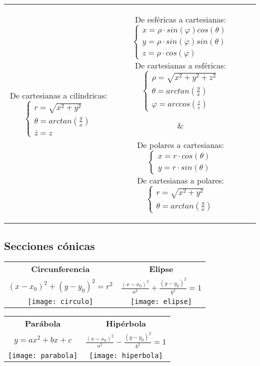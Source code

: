 \documentclass[a4paper, twoside]{article}
\numberwithin{equation}{section}
\numberwithin{figure}{section}
\numberwithin{table}{section}
\begin{document}
\begin{table}[H]
\begin{tabular}{c|c|c}
{\begin{center}
				De cartesianas a cilíndricas:
				$\begin{cases}
				r=\sqrt{x^2+y^2} \\
				\theta=arctan(\frac{y}{x}) \\
				\bar{z}=z
				\end{cases}$
			\end{center}} &
		\parbox{5cm}{
			\begin{center}
				De esféricas a cartesianas:
				$\begin{cases}
				x=\rho\cdot sin(\varphi)cos(\theta) \\
				y=\rho\cdot sin(\varphi)sin(\theta) \\
				z=\rho\cdot cos(\varphi)
				\end{cases}$ \\
				De cartesianas a esféricas:
				$\begin{cases}
				\rho=\sqrt{x^2+y^2+z^2} \\
				\theta=arctan(\frac{y}{x}) \\
				\varphi=arccos(\frac{z}{r})\end{cases}$
			\end{center}} &
		\parbox{5cm}{
			\begin{center}
				De polares a cartesianas:
				$\begin{cases}
				x=r\cdot cos(\theta) \\
				y=r\cdot sin(\theta)
				\end{cases}$ \\
				De cartesianas a polares:
				$\begin{cases}
				r=\sqrt{x^2+y^2} \\
				\theta=arctan(\frac{y}{x})
				\end{cases}$
			\end{center}} \\
	\end{tabular}
\end{table}

\subsection{Secciones cónicas}
\begin{center}
	\setlength{\tabcolsep}{30pt}
	\begin{tabular}{c c}
		\textbf{Circunferencia} & \textbf{Elipse} \\
		$(x-x_0)^2+(y-y_0)^2=r^2$ & $\frac{(x-x_0)^2}{a^2}+\frac{(y-y_0)^2}{b^2}=1$ \\
		\texttt{[image: circulo]} & \texttt{[image: elipse]}
	\end{tabular}
	\begin{tabular}{c c}
		\textbf{Parábola} & \textbf{Hipérbola} \\
		$y=ax^2+bx+c$ & $\frac{(x-x_0)^2}{a^2}-\frac{(y-y_0)^2}{b^2}=1$ \\
		\texttt{[image: parabola]} & \texttt{[image: hiperbola]}
	\end{tabular}
	\setlength{\tabcolsep}{6pt}
\end{center}
\end{document}
